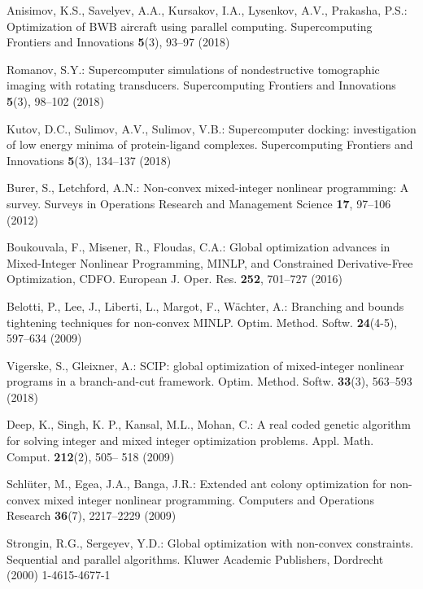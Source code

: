\documentclass[runningheads]{llncs}
\begin{document}
\begin{thebibliography}{10}

Anisimov, K.S., Savelyev, A.A.,	Kursakov, I.A.,	Lysenkov, A.V.,	Prakasha, P.S.: Optimization of BWB aircraft using parallel computing. Supercomputing Frontiers and Innovations \textbf{5}(3), 93--97 (2018)

Romanov, S.Y.: Supercomputer simulations of nondestructive tomographic imaging with rotating transducers. Supercomputing Frontiers and Innovations \textbf{5}(3), 98--102 (2018)

Kutov, D.C., Sulimov, A.V., Sulimov, V.B.: Supercomputer docking: investigation of low energy minima of protein-ligand complexes. Supercomputing Frontiers and Innovations \textbf{5}(3), 134--137 (2018)

Burer, S., Letchford, A.N.: Non-convex mixed-integer nonlinear programming: A survey.
Surveys in Operations Research and Management Science \textbf{17}, 97--106 (2012)

Boukouvala, F., Misener, R., Floudas, C.A.: Global optimization advances in Mixed-Integer
Nonlinear Programming, MINLP, and Constrained Derivative-Free Optimization, CDFO.
European J. Oper. Res. \textbf{252}, 701--727 (2016)

Belotti, P., Lee, J., Liberti, L., Margot, F., W\"achter, A.: Branching and bounds tightening
techniques for non-convex MINLP. Optim. Method. Softw. \textbf{24}(4-5), 597--634 (2009)

Vigerske, S., Gleixner, A.: SCIP: global optimization of mixed-integer nonlinear programs in a
branch-and-cut framework.
Optim. Method. Softw. \textbf{33}(3), 563--593 (2018)

Deep, K., Singh, K. P., Kansal, M.L., Mohan, C.: A real coded genetic algorithm for solving
integer and mixed integer optimization problems. Appl. Math. Comput. \textbf{212}(2), 505--
518 (2009)

Schl\"uter, M., Egea, J.A., Banga, J.R.: Extended ant colony optimization for non-convex
mixed integer nonlinear programming. Computers and Operations Research \textbf{36}(7),
2217--2229 (2009)

Strongin, R.G., Sergeyev, Y.D.: Global optimization with non-convex constraints. Sequential
and parallel algorithms. Kluwer Academic Publishers, Dordrecht (2000) %
1-4615-4677-1


\end{thebibliography}
\end{document}
